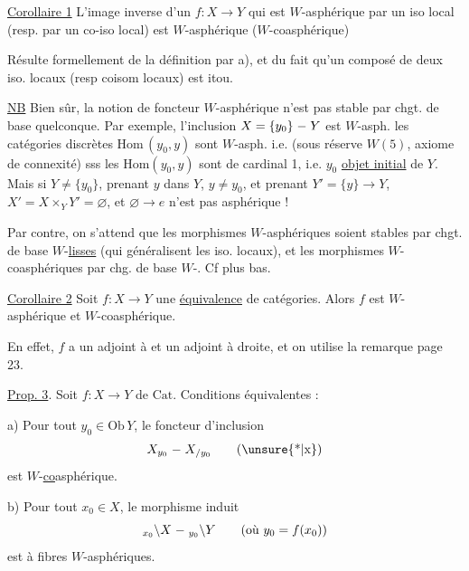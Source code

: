  \uline{Corollaire 1} L'image inverse d'un $f:X\longrightarrow Y$ qui est $W$-asphérique  par un iso local (resp. par un co-iso local) est $W$-asphérique ($W$-coasphérique)

 Résulte formellement de la définition par a), et du fait qu'un composé de deux iso. locaux (resp coisom locaux) est itou.

\uline{NB} Bien sûr, la notion de foncteur $W$-asphérique n'est pas stable par chgt. de base quelconque.  Par exemple, l'inclusion $X=\{y_0\}\mathrel{\relbar}Y$ est $W$-asph.  les catégories discrètes $\mathrm{Hom}\,(y_0,y)$ sont $W$-asph. i.e. (sous réserve  $W(5)$, axiome de connexité) sss les $\mathrm{Hom}(y_0,y)$ sont de cardinal 1, i.e. $y_0$ \uline{objet initial} de $Y$. Mais si $Y\ne\{y_0\}$, prenant $y$ dans $Y$, $y\ne y_0$,  et prenant $Y'=\{y\}\longrightarrow Y$,  $X'=X\times_Y Y'=\varnothing$, et $\varnothing\longrightarrow e$ n'est pas asphérique !


Par contre, on s'attend que les  morphismes $W$-asphériques soient stables par chgt. de base $W$-\uline{lisses} (qui généralisent les iso. locaux), et les morphismes $W$-coasphériques par chg. de base $W$-. Cf plus bas.

\uline{Corollaire 2} Soit $f:X\longrightarrow Y$  une \uline{équivalence} de catégories. Alors $f$ est $W$-asphérique et $W$-coasphérique.

En effet, $f$ a un adjoint à  et un adjoint à droite, et on utilise la remarque page 23.

\uline{Prop. 3}. Soit $f:X\longrightarrow Y$ de $\mathrm{Cat}$. Conditions équivalentes :

a) Pour tout $y_0\in\mathrm{Ob}\,Y$, le foncteur d'inclusion \[X_{y_0}\mathrel{\relbar}X_{/y_0}\tag*{(\unsure{*|x})}\] est $W$-\uline{co}asphérique.

b) Pour tout $x_0\in X$, le morphisme induit  \[{}_{x_0}\backslash X\mathrel{\relbar}{}_{y_0}\backslash Y\qquad(\text{où }y_0=f(x_0))\] est à fibres $W$-asphériques.

